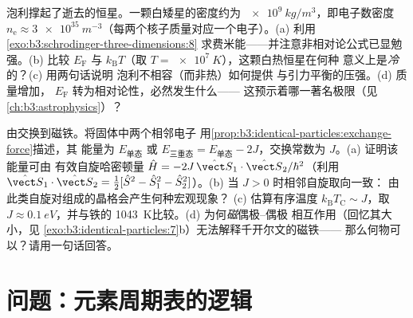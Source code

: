 \begin{exercise}[$\star\star\star$]\label{exo:b3:identical-particles:11}
泡利撑起了逝去的恒星。一颗白矮星的密度约为
$\qty{e9}{kg/m^3}$，即电子数密度 $n_{\text{e}} \approx
\qty{3e35}{m^{-3}}$（每两个核子质量对应一个电子）。(a)
利用
\cref{exo:b3:schrodinger-three-dimensions:8}
求费米能——并注意非相对论公式已显勉强。(b) 比较
$E_{\text{F}}$ 与 $k_{\text{B}}T$（取 $T = \qty{e7}{K}$），这颗白热恒星在何种
意义上是\emph{冷}的？(c) 用两句话说明
泡利不相容（而非热）如何提供
与引力平衡的压强。(d) 质量增加，
$E_{\text{F}}$ 转为相对论性，必然发生什么——
这预示着哪一著名极限（见\cref{ch:b3:astrophysics}）？
\end{exercise}

\begin{exercise}[$\star\star\star$]\label{exo:b3:identical-particles:12}
由交换到磁铁。将固体中两个相邻电子
用\cref{prop:b3:identical-particles:exchange-force}描述，其
能量为 $E_{\text{单态}}$ 或 $E_{\text{三重态}} =
E_{\text{单态}} - 2J$，交换常数为 $J$。(a) 证明该能量可由
有效自旋哈密顿量 $\hat H =
-2J\,\hat{\vect S}_1\cdot\hat{\vect S}_2/\hbar^2$（利用
$\hat{\vect S}_1\cdot\hat{\vect S}_2 = \tfrac12[\hat S^2 - \hat
S_1^2 - \hat S_2^2]$）。(b) 当 $J > 0$ 时相邻自旋取向一致：
由此类自旋对组成的晶格会产生何种宏观现象？
(c) 估算有序温度 $k_{\text{B}}T_{\text{C}}
\sim J$，取 $J \approx \qty{0.1}{eV}$，并与铁的
\qty{1043}{K}比较。(d) 为何\emph{磁}偶极–偶极
相互作用（回忆其大小，见
\cref{exo:b3:identical-particles:7}b）无法解释千开尔文的磁铁——
那么何物可以？请用一句话回答。
\end{exercise}

\section{问题：元素周期表的逻辑}

